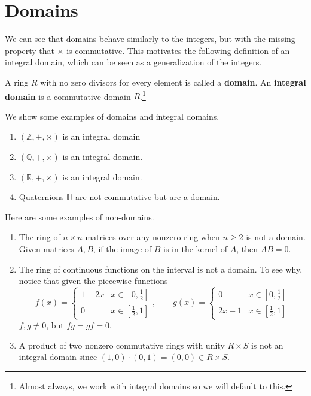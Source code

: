\section{Domains}

  We can see that domains behave similarly to the integers, but with the missing property that $\times$ is commutative. This motivates the following definition of an integral domain, which can be seen as a generalization of the integers. 

  \begin{definition}
    A ring $R$ with no zero divisors for every element is called a \textbf{domain}. An \textbf{integral domain} is a commutative domain $R$.\footnote{Almost always, we work with integral domains so we will default to this.} 
  \end{definition} 

  \begin{example}
    We show some examples of domains and integral domains. 
    \begin{enumerate}
      \item $(\mathbb{Z}, +, \times)$ is an integral domain
      \item $(\mathbb{Q}, +, \times)$ is an integral domain. 
      \item $(\mathbb{R}, +, \times)$ is an integral domain. 
      \item Quaternions $\mathbb{H}$ are not commutative but are a domain. 
    \end{enumerate}
  \end{example} 

  \begin{example}
    Here are some examples of non-domains. 
    \begin{enumerate}
      \item The ring of $n \times n$ matrices over any nonzero ring when $ n \geq 2$ is not a domain. Given matrices $A, B$, if the image of $B$ is in the kernel of $A$, then $A B = 0$.
      \item The ring of continuous functions on the interval is not a domain. To see why, notice that given the piecewise functions 
      \begin{equation}
        f (x) = \begin{cases}
          1 - 2x & x \in [0, \frac{1}{2}] \\
          0 & x \in [\frac{1}{2}, 1] 
        \end{cases}, \qquad 
        g (x) = \begin{cases}
          0 & x \in [0, \frac{1}{2}] \\
          2x - 1 & x \in [\frac{1}{2}, 1] 
        \end{cases}
      \end{equation}
      $f, g \neq 0$, but $f g = g f = 0$. 

      \item A product of two nonzero commutative rings with unity $R \times S$ is not an integral domain since $(1,0) \cdot (0, 1) = (0, 0) \in R \times S$. 
    \end{enumerate}
  \end{example}

